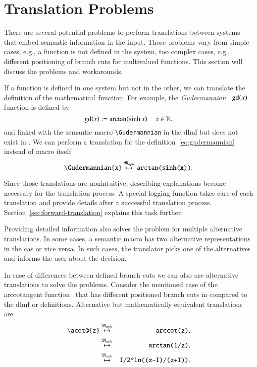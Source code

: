 \section{Translation Problems}\label{sec:problems}
There are several potential problems to perform translations between systems that embed semantic information in the input. Those problems vary from simple cases, e.g., a function is not defined in the system, too complex cases, e.g., different positioning of branch cuts for multivalued functions. This section will discuss the problems and workarounds.

If a function is defined in one system but not in the other, we can translate the definition of the mathematical function. For example, the \textit{Gudermannian}~\parencite[eq. 4.23.10]{NIST:DLMF} $\mathrm{gd}\!\left(x\right)$ function is defined by
\begin{equation}\label{eq:gudermannian}
\mathrm{gd}\!\left(x\right) := \mathrm{arctan}\!\left(\sinh{x}\right) \quad x \in \mathbb{R}.
\end{equation}
and linked with the semantic macro \verb|\Gudermannian| in the \gls*{dlmf} but does not exist in \Maple. We can perform a translation for the definition~\ref{eq:gudermannian} instead of macro itself
\begin{equation}\label{eq:guder-trans}
\verb|\Gudermannian{x}| \overset{\langMaple}{\mapsto} \texttt{arctan(sinh(x))}.
\end{equation}

Since those translations are nonintuitive, describing explanations become necessary for the translation process. A special logging function takes care of each translation and provide details after a successful translation process. Section~\ref{sec:forward-translation} explains this task further.

Providing detailed information also solves the problem for multiple alternative translations. In some cases, a semantic macro has two alternative representations in the \gls*{cas} or vice versa. In such cases, the translator picks one of the alternatives and informs the user about the decision.

In case of differences between defined branch cuts we can also use alternative translations to solve the problems. Consider the mentioned case of the arccotangent function~\parencite{Branches:acot} that has different positioned branch cuts in \Maple{} compared to the \gls*{dlmf} or \Mathematica{} definitions. Alternative but mathematically equivalent translations are
\begin{eqnarray}
\verb|\acot@{z}| & \overset{\langMaple}{\mapsto} & \verb|arccot(z)|,\label{eq:acot-alternatives}\\
& \overset{\langMaple}{\mapsto} & \verb|arctan(1/z)|,\label{eq:acot-alternatives-1}\\
& \overset{\langMaple}{\mapsto} & \verb|I/2*ln((z-I)/(z+I))|.\label{eq:acot-alternatives-2}
\end{eqnarray}

